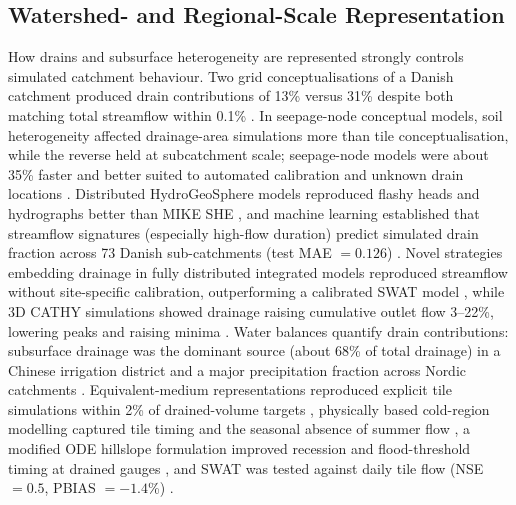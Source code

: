 \subsection{Watershed- and Regional-Scale Representation}

How drains and subsurface heterogeneity are represented strongly controls simulated catchment behaviour. Two grid conceptualisations of a Danish catchment produced drain contributions of 13\% versus 31\% despite both matching total streamflow within 0.1\% \parencite{Karan2021}. In seepage-node conceptual models, soil heterogeneity affected drainage-area simulations more than tile conceptualisation, while the reverse held at subcatchment scale; seepage-node models were about 35\% faster and better suited to automated calibration and unknown drain locations \parencite{Boico2022}. Distributed HydroGeoSphere models reproduced flashy heads and hydrographs better than MIKE SHE \parencite{DeSchepper2017}, and machine learning established that streamflow signatures (especially high-flow duration) predict simulated drain fraction across 73 Danish sub-catchments (test MAE $=0.126$) \parencite{Schneider2022}. Novel strategies embedding drainage in fully distributed integrated models reproduced streamflow without site-specific calibration, outperforming a calibrated SWAT model \parencite{Rathore2024}, while 3D CATHY simulations showed drainage raising cumulative outlet flow 3--22\%, lowering peaks and raising minima \parencite{Muma2016}. Water balances quantify drain contributions: subsurface drainage was the dominant source (about 68\% of total drainage) in a Chinese irrigation district \parencite{Zheng2025b} and a major precipitation fraction across Nordic catchments \parencite{Nousiainen2015,Turunen2013}. Equivalent-medium representations reproduced explicit tile simulations within 2\% of drained-volume targets \parencite{Thomas2016}, physically based cold-region modelling captured tile timing and the seasonal absence of summer flow \parencite{Kompanizare2024}, a modified ODE hillslope formulation improved recession and flood-threshold timing at drained gauges \parencite{Fonley2021}, and SWAT was tested against daily tile flow (NSE $=0.5$, PBIAS $=-1.4$\%) \parencite{Rahman2014}.

